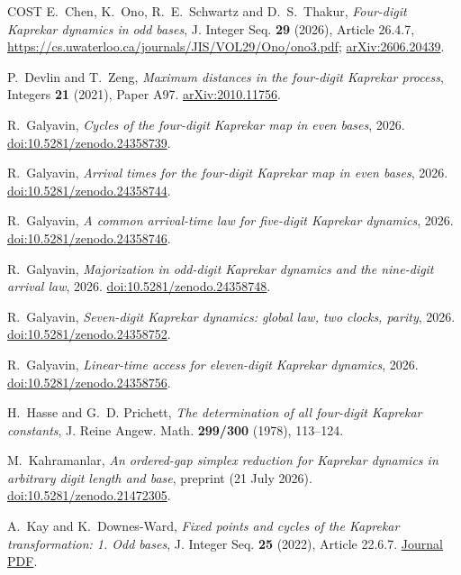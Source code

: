 \documentclass[11pt,reqno]{amsart}
\theoremstyle{remark}
\begin{document}
\begingroup\raggedright
\begin{thebibliography}{COST}
E.~Chen, K.~Ono, R.~E.~Schwartz and D.~S.~Thakur,
\emph{Four-digit Kaprekar dynamics in odd bases},
J. Integer Seq. \textbf{29} (2026), Article 26.4.7,
\url{https://cs.uwaterloo.ca/journals/JIS/VOL29/Ono/ono3.pdf};
\href{https://arxiv.org/abs/2606.20439}{arXiv:2606.20439}.

P.~Devlin and T.~Zeng, \emph{Maximum distances in the four-digit Kaprekar process},
Integers \textbf{21} (2021), Paper A97.
\href{https://arxiv.org/abs/2010.11756}{arXiv:2010.11756}.

R.~Galyavin, \emph{Cycles of the four-digit Kaprekar map in even bases}, 2026.
\href{https://doi.org/10.5281/zenodo.24358739}{doi:10.5281/zenodo.24358739}.

R.~Galyavin, \emph{Arrival times for the four-digit Kaprekar map in even bases}, 2026.
\href{https://doi.org/10.5281/zenodo.24358744}{doi:10.5281/zenodo.24358744}.

R.~Galyavin, \emph{A common arrival-time law for five-digit Kaprekar dynamics}, 2026.
\href{https://doi.org/10.5281/zenodo.24358746}{doi:10.5281/zenodo.24358746}.

R.~Galyavin, \emph{Majorization in odd-digit Kaprekar dynamics and the nine-digit arrival law}, 2026.
\href{https://doi.org/10.5281/zenodo.24358748}{doi:10.5281/zenodo.24358748}.

R.~Galyavin, \emph{Seven-digit Kaprekar dynamics: global law, two clocks, parity}, 2026.
\href{https://doi.org/10.5281/zenodo.24358752}{doi:10.5281/zenodo.24358752}.

R.~Galyavin, \emph{Linear-time access for eleven-digit Kaprekar dynamics}, 2026.
\href{https://doi.org/10.5281/zenodo.24358756}{doi:10.5281/zenodo.24358756}.

H.~Hasse and G.~D. Prichett, \emph{The determination of all four-digit Kaprekar constants}, J. Reine Angew. Math. \textbf{299/300} (1978), 113--124.

M.~Kahramanlar, \emph{An ordered-gap simplex reduction for Kaprekar dynamics in arbitrary digit length and base}, preprint (21 July 2026).
\href{https://doi.org/10.5281/zenodo.21472305}{doi:10.5281/zenodo.21472305}.

A.~Kay and K.~Downes-Ward, \emph{Fixed points and cycles of the Kaprekar transformation: 1. Odd bases},
J. Integer Seq. \textbf{25} (2022), Article 22.6.7.
\href{https://cs.uwaterloo.ca/journals/JIS/VOL25/Kay/kay5.pdf}{Journal PDF}.


\end{thebibliography}
\end{document}
